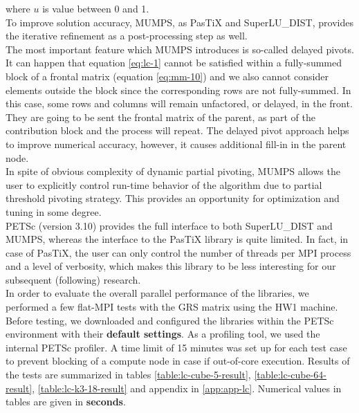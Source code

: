 where $u$ is value between 0 and 1.\\

To improve solution accuracy, MUMPS, as PasTiX and SuperLU\_DIST, provides the iterative refinement as a post-processing step as well.\\


The most important feature which MUMPS introduces is so-called delayed pivots. It can happen that equation \ref{eq:lc-1} cannot be satisfied within a fully-summed block of a frontal matrix (equation  \ref{eq:mm-10}) and we also cannot consider elements outside the block since the corresponding rows are not fully-summed. In this case, some rows and columns will remain unfactored, or delayed, in the front. They are going to be sent the frontal matrix of the parent, as part of the contribution block and the process will repeat. The delayed pivot approach helps to improve numerical accuracy, however, it causes additional fill-in in the parent node.\\


In spite of obvious complexity of dynamic partial pivoting, MUMPS allows the user to explicitly control run-time behavior of the algorithm due to partial threshold pivoting strategy. This provides an opportunity for optimization and tuning in some degree.\\


PETSc (version 3.10) provides the full interface to both SuperLU\_DIST and MUMPS, whereas the interface to the PasTiX library is quite limited. In fact, in case of PasTiX, the user can only control the number of threads per MPI process and a level of verbosity, which makes this library to be less interesting for our subsequent (following) research.\\


In order to evaluate the overall parallel performance of the libraries, we performed a few flat-MPI tests with the GRS matrix using the HW1 machine. Before testing, we downloaded and configured the libraries within the PETSc environment with their \textbf{default settings}. As a profiling tool, we used the internal PETSc profiler. A time limit of 15 minutes was set up for each test case to prevent blocking of a compute node in case if out-of-core execution. Results of the tests are summarized in tables \ref{table:lc-cube-5-result}, \ref{table:lc-cube-64-result}, \ref{table:lc-k3-18-result} and appendix in \ref{app:app-lc}. Numerical values in tables are given in \textbf{seconds}.\\


